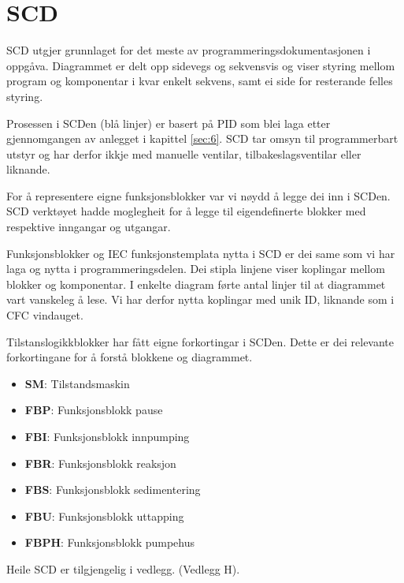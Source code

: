 \newpage
\section{SCD}
\thispagestyle{fancy}

\gls{SCD} utgjer grunnlaget for det meste av programmeringsdokumentasjonen i oppgåva.
Diagrammet er delt opp sidevegs og sekvensvis og viser styring mellom program og komponentar i kvar enkelt sekvens,
samt ei side for resterande felles styring.

Prosessen i \gls{SCD}en (blå linjer) er basert på \gls{PID} som blei laga etter gjennomgangen av anlegget i kapittel \ref{sec:6}.
\gls{SCD} tar omsyn til programmerbart utstyr og har derfor ikkje med manuelle ventilar, tilbakeslagsventilar eller liknande.

For å representere eigne funksjonsblokker var vi nøydd å legge dei inn i \gls{SCD}en.
\gls{SCD} verktøyet hadde moglegheit for å legge til eigendefinerte blokker med respektive inngangar og utgangar.

Funksjonsblokker og \gls{IEC} funksjonstemplata nytta i \gls{SCD} er dei same som vi har laga og nytta i programmeringsdelen. 
Dei stipla linjene viser koplingar mellom blokker og komponentar. \newline
I enkelte diagram førte antal linjer til at diagrammet vart vanskeleg å lese. 
Vi har derfor nytta koplingar med unik ID, liknande som i CFC vindauget.

Tilstanslogikkblokker har fått eigne forkortingar i \gls{SCD}en.
Dette er dei relevante forkortingane for å forstå blokkene og diagrammet.

\begin{itemize}
    \item \textbf{SM}:   Tilstandsmaskin
    \item \textbf{FBP}:  Funksjonsblokk pause
    \item \textbf{FBI}:  Funksjonsblokk innpumping
    \item \textbf{FBR}:  Funksjonsblokk reaksjon
    \item \textbf{FBS}:  Funksjonsblokk sedimentering
    \item \textbf{FBU}:  Funksjonsblokk uttapping
    \item \textbf{FBPH}: Funksjonsblokk pumpehus
\end{itemize}

Heile \gls{SCD} er tilgjengelig i vedlegg. (Vedlegg H). \newline
\newpage

